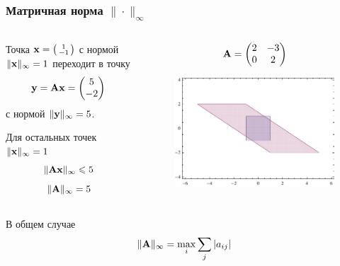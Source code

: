 \documentclass[apectratio=43,unicode]{beamer}
\begin{document}
\begin{frame}
\frametitle{Матричная норма $\|\cdot\|_\infty$}
	\begin{columns}[T]
	\begin{column}{0.6\textwidth}
	Точка 
	${\mathbf{x}} = \begin{psmallmatrix}
		1\\-1
	\end{psmallmatrix}$
	 с нормой $\|{\mathbf{x}}\|_\infty = 1$ переходит в точку $${\mathbf{y}} = {\mathbf{A}}{\mathbf{x}} = \begin{pmatrix}
		5\\-2
	\end{pmatrix}$$
	 с нормой $\|{\mathbf{y}}\|_\infty = 5$. 

	Для остальных точек $\|{\mathbf{x}}\|_\infty = 1$ 
	$$\|{\mathbf{A}}{\mathbf{x}}\|_\infty \leqslant 5$$
	$$
	\|{\mathbf{A}}\|_\infty = 5
	$$
	\end{column}

	\begin{column}{0.4\textwidth}
	$$
	{\mathbf{A}} = \begin{pmatrix}
		2&-3\\
		0&2
	\end{pmatrix}
	$$
	\begin{figure}%
	\includegraphics[width=\columnwidth]{infty.pdf}%
	\end{figure}
	\end{column}
	\end{columns}
	\begin{block}{В общем случае}
	$$
	\|{\mathbf{A}}\|_\infty = \max_i \sum_j |a_{ij}|
	$$
	\end{block}
\end{frame}
\end{document}
